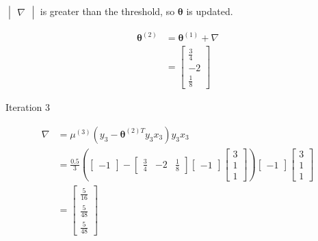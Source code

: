 \documentclass[a4paper, 10pt, twoside]{article}
\begin{document}
\begin{enumerate}[a)]
          $\begin{vmatrix} \nabla \end{vmatrix}$ is greater than the threshold, so $ \bm{\theta} $ is updated.

          \begin{align*}
              \bm{\theta}^{(2)}
               & = \bm{\theta}^{(1)} + \nabla \\
               & =
              \begin{bmatrix}
                  \frac{3}{4} \\ -2 \\ \frac{1}{8}
              \end{bmatrix}
          \end{align*}

          Iteration 3

          \begin{align*}
              \nabla
               & =
              \mu^{(3)}(y_3-\bm{\theta}^{(2)T}y_3x_3)y_3x_3 \\
               & =
              \frac{0.5}{3}
              \left(
              \begin{bmatrix}
                      -1
                  \end{bmatrix}
              -
              \begin{bmatrix}
                      \frac{3}{4} & -2 & \frac{1}{8}
                  \end{bmatrix}
              \begin{bmatrix}
                      -1
                  \end{bmatrix}
              \begin{bmatrix}
                      3 \\ 1 \\ 1
                  \end{bmatrix}
              \right)
              \begin{bmatrix}
                  -1
              \end{bmatrix}
              \begin{bmatrix}
                  3 \\ 1 \\ 1
              \end{bmatrix}                    \\
               & =
              \begin{bmatrix}
                  \frac{5}{16} \\ \frac{5}{48} \\ \frac{5}{48}
              \end{bmatrix}
          \end{align*}


\end{enumerate}
\end{document}
